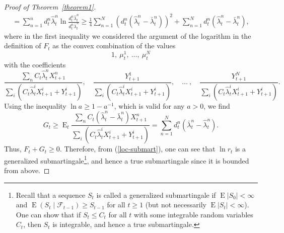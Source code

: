 \documentclass[a4paper,11pt,english]{article}
\theoremstyle{definition}
\DeclareMathOperator{\E}{E}
\renewcommand{\hat}{\widehat}
\newcommand{\F}{\mathcal{F}}
\begin{document}
\begin{proof}[Proof of Theorem~\ref{theorem1}]
\begin{multline}
= \sum_{n=1}^n d_t^n \hat\lambda_t^n
\ln\frac{d_t^n\hat\lambda_t^n}{d_t^n\bar\lambda_t^n} \ge
\frac 14\sum_{n=1}^N (d_t^n(\hat\lambda_t^n - \bar \lambda_t^n))^2 + \sum_{n=1}^N d_t^n(\hat\lambda_t^n - \bar \lambda_t^n),
\end{multline}
where in the first inequality we considered the argument of the logarithm in
the definition of $F_t$ as the convex combination of the values
\[
1,\ \mu_t^1,\ \ldots ,\ \mu_t^N
\]
with the coefficients
\[
\frac{\sum_n C_t \hat\lambda_t^n X_{t+1}^n}{\sum_i(C_t\hat\lambda_t^iX_{t+1}^i +
Y_{t+1}^i)},\quad
\frac{Y_{t+1}^1}{\sum_i(C_t\hat\lambda_t^iX_{t+1}^i +
Y_{t+1}^i)},\quad \ldots\ ,\quad 
\frac{Y_{t+1}^N}{\sum_i(C_t\hat\lambda_t^iX_{t+1}^i +
Y_{t+1}^i)}.
\]
Using the inequality $\ln a \ge 1 - a^{-1}$, which is valid for
any $a>0$, we find
\begin{equation}
\label{G}
G_t \ge \E_t \frac{\sum_n C_t(\hat\lambda_t^n - \bar \lambda_t^n)
X_{t+1}^n}{\sum_i(C_t\hat\lambda_t^i X_{t+1}^i + Y_{t+1}^i)} = \sum_{n=1}^N
d_t^n (\bar\lambda_t^n - \hat \lambda_t^n).
\end{equation}
Thus, $F_t+G_t \ge 0$. Therefore, from (\ref{loc-submart}), one can see that
$\ln r_t$ is a generalized submartingale\footnote{Recall
that a sequence $S_t$ is called a generalized submartingale if $\E
|S_0|<\infty$ and $\E(S_t\mid\F_{t-1})\ge S_{t-1}$ for all $t\ge 1$ (but not
necessarily $\E|S_t|<\infty$). One can show that if $S_t\le C_t$ for
all $t$ with some integrable random variables $C_t$, then $S_t$ is
integrable, and hence a true submartingale.}, and hence a true submartingale
since it is bounded from above.
\end{proof}
\end{document}
